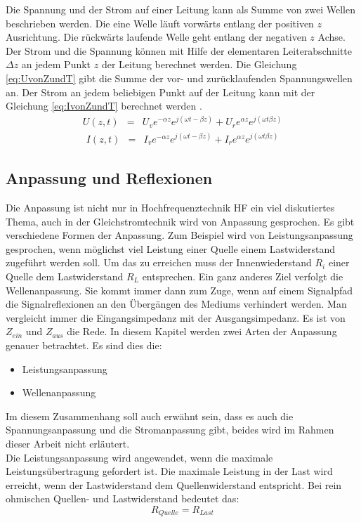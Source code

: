 Die Spannung und der Strom auf einer Leitung kann als Summe von zwei Wellen beschrieben werden. Die eine Welle läuft vorwärts entlang der positiven $z$ Ausrichtung. Die rückwärts laufende Welle geht entlang der negativen $z$ Achse. Der Strom und die Spannung können mit Hilfe der elementaren Leiterabschnitte $\Delta z$ an jedem Punkt $z$  der Leitung berechnet werden. Die Gleichung \ref{eq:UvonZundT} gibt die Summe der vor- und zurücklaufenden Spannungswellen an. Der Strom an jedem beliebigen Punkt auf der Leitung kann mit der Gleichung \ref{eq:IvonZundT} berechnet werden \cite{Tekom}.
\begin{eqnarray}\label{eq:UvonZundT}
U(z,t) &=& U_{v}e^{-\alpha z}e^{j(\omega t -\beta z)}+U_{r}e^{\alpha z}e^{j(\omega t \beta z)}
\end{eqnarray}
\begin{eqnarray}\label{eq:IvonZundT}
I(z,t) &=& I_{v}e^{-\alpha z}e^{j(\omega t -\beta z)}+I_{r}e^{\alpha z}e^{j(\omega t \beta z)}
\end{eqnarray}

\subsection{Anpassung und Reflexionen}\label{sec:AnpassungReflexionen}
Die Anpassung ist nicht nur in Hochfrequenztechnik HF ein viel diskutiertes Thema, auch in der Gleichstromtechnik wird von Anpassung gesprochen. Es gibt verschiedene Formen der Anpassung. Zum Beispiel wird von Leistungsanpassung gesprochen, wenn möglichst viel Leistung einer Quelle einem Lastwiderstand zugeführt werden soll. Um das zu erreichen muss der Innenwiederstand  $R_i$ einer Quelle dem Lastwiderstand $R_L$ entsprechen.  Ein ganz anderes Ziel verfolgt die Wellenanpassung. Sie kommt immer dann zum Zuge, wenn auf einem Signalpfad die Signalreflexionen an den Übergängen des Mediums verhindert werden.
Man vergleicht immer die Eingangsimpedanz mit der Ausgangsimpedanz. Es ist  von $Z_{ein}$ und $Z_{aus}$ die Rede.
In diesem Kapitel werden zwei Arten der Anpassung genauer betrachtet. Es sind dies die:
\begin{itemize}
\item Leistungsanpassung
\item Wellenanpassung
\end{itemize}
Im diesem Zusammenhang soll auch erwähnt sein, dass es auch die Spannungsanpassung und die Stromanpassung gibt, beides wird im Rahmen dieser Arbeit nicht erläutert. \\
Die Leistungsanpassung wird angewendet, wenn die maximale Leistungsübertragung gefordert ist. Die maximale Leistung in der Last wird erreicht, wenn der Lastwiderstand dem Quellenwiderstand entspricht. Bei rein ohmischen Quellen- und Lastwiderstand bedeutet das:\\
\[R_{Quelle} = R_{Last}\]

